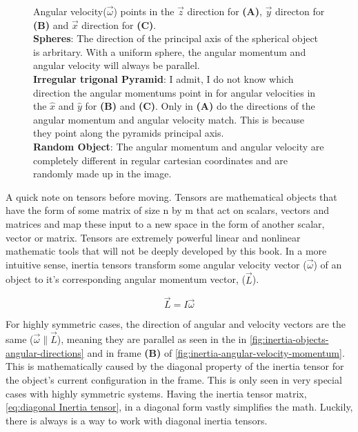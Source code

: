 \documentclass[11pt,a4paper]{book}
\newcommand{\imginput}[1]{} %
\begin{document}
			\begin{figure} [!ht]
				\centering
				\large
				\def\svgwidth{\columnwidth}
				\resizebox{14cm}{!}{\imginput{images/inertia-objects-angular-directions.pdf_tex}}
				\caption{Angular velocity($\vec{\omega}$) points in the $\vec{z}$ direction for \textbf{(A)}, $\vec{y}$ directon for \textbf{(B)} and $\vec{x}$ direction for \textbf{(C)}.\\
				\textbf{Spheres}: The direction of the principal axis of the spherical object is arbritary. With a uniform sphere, the angular momentum and angular velocity will always be parallel.\\
				\textbf{Irregular trigonal Pyramid}: I admit, I do not know which direction the angular momentums point in for angular velocities in the $\hat{x}$ and $\hat{y}$ for \textbf{(B)} and \textbf{(C)}. Only in \textbf{(A)} do the directions of the angular momentum and angular velocity match. This is because they point along the pyramids principal axis.\\
				\textbf{Random Object}: The angular momentum and angular velocity are completely different in regular cartesian coordinates and are randomly made up in the image.
				}
				\label{fig:inertia-objects-angular-directions}
			\end{figure}
				
			A quick note on tensors before moving. Tensors are mathematical objects that have the form of some matrix of size n by m that act on scalars, vectors and matrices and map these input to a new space in the form of another scalar, vector or matrix. Tensors are extremely powerful linear and nonlinear mathematic tools that will not be deeply developed by this book. In a more intuitive sense, inertia tensors transform some angular velocity vector ($\vec{\omega}$) of an object to it's corresponding angular momentum vector, ($\vec{L}$).
			
			\begin{equation}
				\label{eq:angular momentu}
				\vec{L}=I\vec{\omega}
			\end{equation}		
			
			For highly symmetric cases, the direction of angular and velocity vectors are the same ($\vec{\omega} \parallel \vec{L}$), meaning they are parallel as seen in the  in \autoref{fig:inertia-objects-angular-directions} and in frame \textbf{(B)} of \autoref{fig:inertia-angular-velocity-momentum}. This is mathematically caused by the diagonal property of the inertia tensor for the object's current configuration in the frame. This is only seen in very special cases with highly symmetric systems. Having the inertia tensor matrix, \autoref{eq:diagonal Inertia tensor}, in a diagonal form vastly simplifies the math. Luckily, there is always is a way to work with diagonal inertia tensors.
\end{document}
